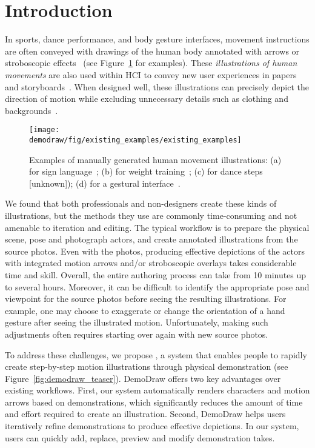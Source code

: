 
\section{Introduction}

In sports, dance performance, and body gesture interfaces, movement instructions are often conveyed with drawings of the human body annotated with arrows or stroboscopic effects~\cite{cutting_representing_2002} (see Figure~\ref{fig:existing_examples} for examples).
These \textit{illustrations of human movements} are also used within HCI to convey new user experiences in papers and storyboards~\cite{Buxton:2007:SUE:1526229}.
When designed well, these illustrations can precisely depict the direction of motion while excluding unnecessary details such as clothing and backgrounds~\cite{cutting_representing_2002}.

\begin{figure}[t]
  \centering
  \texttt{[image: \\demodraw/fig/existing\_examples/existing\_examples]}
  \caption{Examples of manually generated human movement illustrations: (a) for sign language~\protect\cite{corum:2012:sign}; (b) for weight training~\protect\cite{anderson2010stretching}; (c) for dance steps [unknown]); (d) for a gestural interface~\protect\cite{cohn2012humantenna}.}
  \label{fig:existing_examples}
\end{figure}

We found that both professionals and non-designers create these kinds of illustrations, but the methods they use are commonly time-consuming and not amenable to iteration and editing.
The typical workflow is to prepare the physical scene, pose and photograph actors, and create annotated illustrations from the source photos. Even with the photos, producing effective depictions of the actors with integrated motion arrows and/or stroboscopic overlays takes considerable time and skill. Overall, the entire authoring process can take from 10 minutes up to several hours. Moreover, it can be difficult to identify the appropriate pose and viewpoint for the source photos before seeing the resulting illustrations.
%
For example, one may choose to exaggerate or change the orientation of a hand gesture after seeing the illustrated motion.
%
Unfortunately, making such adjustments often requires starting over again with new source photos.

To address these challenges, we propose \systemname{}, a system that enables people to rapidly create step-by-step motion illustrations through physical demonstration (see Figure~\ref{fig:demodraw_teaser}). DemoDraw offers two key advantages over existing workflows. First, our system automatically renders characters and motion arrows based on demonstrations, which significantly reduces the amount of time and effort required to create an illustration. Second, DemoDraw helps users iteratively refine demonstrations to produce effective depictions. In our system, users can quickly add, replace, preview and modify demonstration takes.

